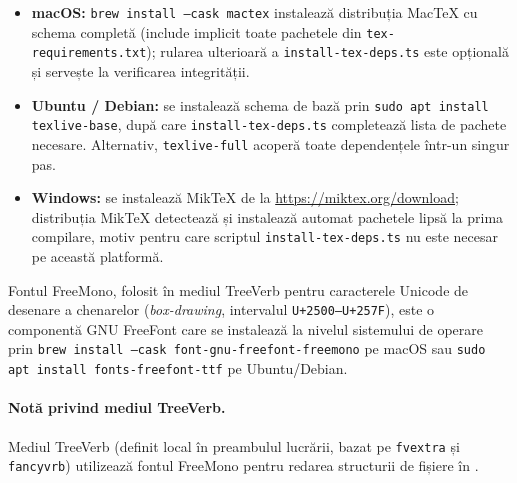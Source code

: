\begin{itemize}
  \item \textbf{macOS:} \texttt{brew install --cask mactex} instalează distribuția MacTeX cu schema completă (include implicit toate pachetele din \texttt{tex-requirements.txt}); rularea ulterioară a \texttt{install-tex-deps.ts} este opțională și servește la verificarea integrității.
  \item \textbf{Ubuntu / Debian:} se instalează schema de bază prin \texttt{sudo apt install texlive-base}, după care \texttt{install-tex-deps.ts} completează lista de pachete necesare. Alternativ, \texttt{texlive-full} acoperă toate dependențele într-un singur pas.
  \item \textbf{Windows:} se instalează MikTeX de la \url{https://miktex.org/download}; distribuția MikTeX detectează și instalează automat pachetele lipsă la prima compilare, motiv pentru care scriptul \texttt{install-tex-deps.ts} nu este necesar pe această platformă.
\end{itemize}

Fontul FreeMono, folosit în mediul TreeVerb pentru caracterele Unicode de desenare a chenarelor (\textit{box-drawing}, intervalul \texttt{U+2500--U+257F}), este o componentă GNU FreeFont care se instalează la nivelul sistemului de operare prin \texttt{brew install --cask font-gnu-freefont-freemono} pe macOS sau \texttt{sudo apt install fonts-freefont-ttf} pe Ubuntu/Debian.

\paragraph{Notă privind mediul TreeVerb.}
Mediul TreeVerb (definit local în preambulul lucrării, bazat pe \texttt{fvextra} și \texttt{fancyvrb}) utilizează fontul FreeMono pentru redarea structurii de fișiere în .


